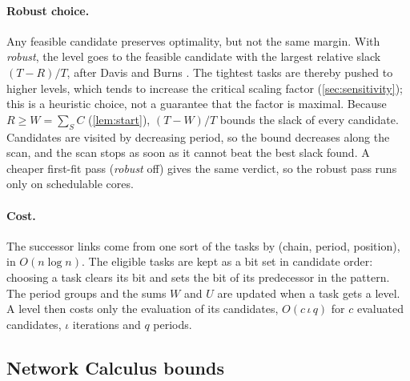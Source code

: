 \paragraph{Robust choice.} Any feasible candidate preserves optimality, but
not the same margin. With \textit{robust}, the level goes to the feasible
candidate with the largest relative slack $(T-R)/T$, after Davis and Burns
\cite{davis2007robust}. The tightest tasks are thereby pushed to higher
levels, which tends to increase the critical scaling factor
(\cref{sec:sensitivity}); this is a heuristic choice, not a guarantee
that the factor is maximal. Because $R\ge W=\sum_{S}C$ (\cref{lem:start}),
$(T-W)/T$ bounds the slack of every candidate. Candidates are visited by
decreasing period, so the bound decreases along the scan, and the scan
stops as soon as it cannot beat the best slack found. A cheaper first-fit
pass (\textit{robust} off) gives the same verdict, so the robust pass runs
only on schedulable cores.

\paragraph{Cost.} The successor links come from one sort of the tasks by
(chain, period, position), in $O(n\log n)$. The eligible tasks are kept as
a bit set in candidate order: choosing a task clears its bit and sets the
bit of its predecessor in the pattern. The period groups and the sums $W$
and $U$ are updated when a task gets a level. A level then costs only the
evaluation of its candidates, $O(c\,\iota\,q)$ for $c$ evaluated candidates,
$\iota$ iterations and $q$ periods.

\subsection{Network Calculus bounds}
\label{sec:nc}


